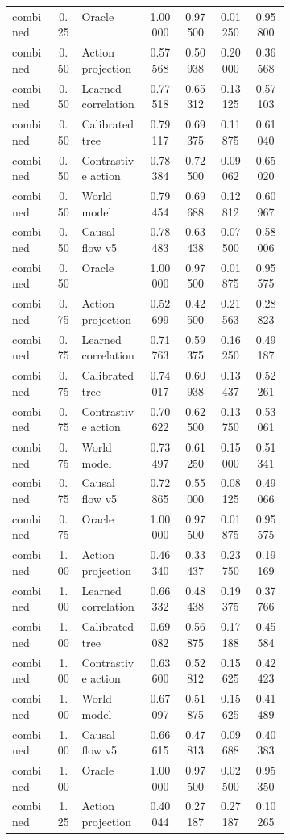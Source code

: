 \documentclass{article}
\begin{document}
\begin{center}
\begin{longtable}{p{0.16\linewidth}cp{0.24\linewidth}cccc}
combined & 0.25 & Oracle & 1.00000 & 0.97500 & 0.01250 & 0.95800\\
combined & 0.50 & Action projection & 0.57568 & 0.50938 & 0.20000 & 0.36568\\
combined & 0.50 & Learned correlation & 0.77518 & 0.65312 & 0.13125 & 0.57103\\
combined & 0.50 & Calibrated tree & 0.79117 & 0.69375 & 0.11875 & 0.61040\\
combined & 0.50 & Contrastive action & 0.78384 & 0.72500 & 0.09062 & 0.65020\\
combined & 0.50 & World model & 0.79454 & 0.69688 & 0.12812 & 0.60967\\
combined & 0.50 & Causal flow v5 & 0.78483 & 0.63438 & 0.07500 & 0.58006\\
combined & 0.50 & Oracle & 1.00000 & 0.97500 & 0.01875 & 0.95575\\
combined & 0.75 & Action projection & 0.52699 & 0.42500 & 0.21563 & 0.28823\\
combined & 0.75 & Learned correlation & 0.71763 & 0.59375 & 0.16250 & 0.49187\\
combined & 0.75 & Calibrated tree & 0.74017 & 0.60938 & 0.13437 & 0.52261\\
combined & 0.75 & Contrastive action & 0.70622 & 0.62500 & 0.13750 & 0.53061\\
combined & 0.75 & World model & 0.73497 & 0.61250 & 0.15000 & 0.51341\\
combined & 0.75 & Causal flow v5 & 0.72865 & 0.55000 & 0.08125 & 0.49066\\
combined & 0.75 & Oracle & 1.00000 & 0.97500 & 0.01875 & 0.95575\\
combined & 1.00 & Action projection & 0.46340 & 0.33437 & 0.23750 & 0.19169\\
combined & 1.00 & Learned correlation & 0.66332 & 0.48438 & 0.19375 & 0.37766\\
combined & 1.00 & Calibrated tree & 0.69082 & 0.56875 & 0.17188 & 0.45584\\
combined & 1.00 & Contrastive action & 0.63600 & 0.52812 & 0.15625 & 0.42423\\
combined & 1.00 & World model & 0.67097 & 0.51875 & 0.15625 & 0.41489\\
combined & 1.00 & Causal flow v5 & 0.66615 & 0.47813 & 0.09688 & 0.40383\\
combined & 1.00 & Oracle & 1.00000 & 0.97500 & 0.02500 & 0.95350\\
combined & 1.25 & Action projection & 0.40044 & 0.27187 & 0.27187 & 0.10265\\

\end{longtable}
\end{center}
\end{document}
